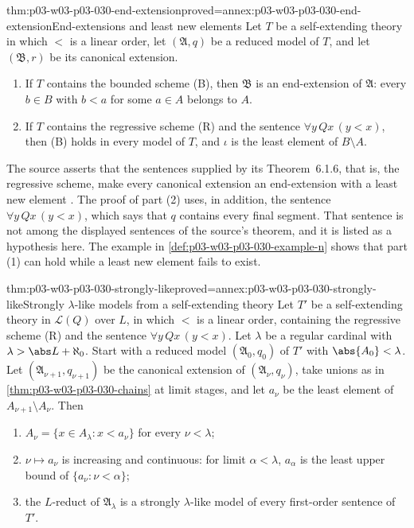 \begin{hblemma}{thm:p03-w03-p03-030-end-extension}{proved=annex:p03-w03-p03-030-end-extension}{End-extensions and least new elements}
Let \(T\) be a self-extending theory in which \(<\) is a linear order, let
\((\mathfrak A,q)\) be a reduced model of \(T\), and let \((\mathfrak B,r)\)
be its canonical extension.
\begin{enumerate}
\item If \(T\) contains the bounded scheme (B), then \(\mathfrak B\) is an
  end-extension of \(\mathfrak A\): every \(b\in B\) with \(b<a\) for some
  \(a\in A\) belongs to \(A\).
\item If \(T\) contains the regressive scheme (R) and the sentence
  \(\forall y\,Qx\,(y<x)\), then (B) holds in every model of \(T\), and
  \(\iota\) is the least element of \(B\setminus A\).
\end{enumerate}
\end{hblemma}

The source asserts that the sentences supplied by its Theorem~6.1.6, that is,
the regressive scheme, make every canonical extension an end-extension with a
least new element \cite[pp.~204--205]{Schmerl1985TransferTheorems}.  The
proof of part (2) uses, in addition, the sentence
\(\forall y\,Qx\,(y<x)\), which says that \(q\) contains every final segment.
That sentence is not among the displayed sentences of the source's theorem,
and it is listed as a hypothesis here.  The example in
\cref{def:p03-w03-p03-030-example-n} shows that part (1) can hold while a
least new element fails to exist.

\begin{hbtheorem}{thm:p03-w03-p03-030-strongly-like}{proved=annex:p03-w03-p03-030-strongly-like}{Strongly \(\lambda\)-like models from a self-extending theory}
Let \(T'\) be a self-extending theory in \(\mathscr L(Q)\) over \(L\), in
which \(<\) is a linear order, containing the regressive scheme (R) and the
sentence \(\forall y\,Qx\,(y<x)\).  Let \(\lambda\) be a regular cardinal with
\(\lambda>\abs L+\aleph_0\).  Start with a reduced model
\((\mathfrak A_0,q_0)\) of \(T'\) with \(\abs{A_0}<\lambda\).  Let
\((\mathfrak A_{\nu+1},q_{\nu+1})\) be the canonical extension of
\((\mathfrak A_\nu,q_\nu)\), take unions as in
\cref{thm:p03-w03-p03-030-chains} at limit stages, and let \(a_\nu\) be the
least element of \(A_{\nu+1}\setminus A_\nu\).  Then
\begin{enumerate}
\item \(A_\nu=\{x\in A_\lambda:x<a_\nu\}\) for every \(\nu<\lambda\);
\item \(\nu\mapsto a_\nu\) is increasing and continuous: for limit
  \(\alpha<\lambda\), \(a_\alpha\) is the least upper bound of
  \(\{a_\nu:\nu<\alpha\}\);
\item the \(L\)-reduct of \(\mathfrak A_\lambda\) is a strongly \(\lambda\)-like
  model of every first-order sentence of \(T'\).
\end{enumerate}
\end{hbtheorem}

